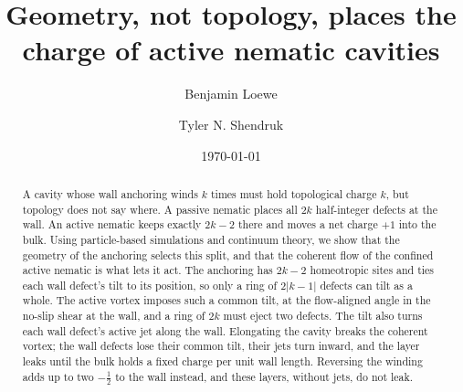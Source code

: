 \documentclass[aps,prl,twocolumn,superscriptaddress,amsmath,amssymb,reprint]{revtex4-2}
\newcommand{\half}{\tfrac12}
\begin{document}
\title{Geometry, not topology, places the charge of active nematic cavities}
\author{Benjamin Loewe}
\author{Tyler N. Shendruk}
\date{\today}

\begin{abstract}
A cavity whose wall anchoring winds $k$ times must hold topological charge $k$, but topology does not say where. A passive nematic places all $2k$ half-integer
defects at the wall. An active nematic keeps exactly $2k-2$ there and moves a net charge $+1$ into the bulk. Using particle-based simulations and continuum theory,
we show that the geometry of the anchoring selects this split, and that the coherent flow of the confined active nematic is what lets it act. The anchoring has
$2k-2$ homeotropic sites and ties each wall defect's tilt to its position, so only a ring of $2|k-1|$ defects can tilt as a whole. The active vortex imposes such
a common tilt, at the flow-aligned angle in the no-slip shear at the wall, and a ring of $2k$ must eject two defects. The tilt also turns each wall defect's active
jet along the wall. Elongating the cavity breaks the coherent vortex; the wall defects lose their common tilt, their jets turn inward, and the layer leaks until the
bulk holds a fixed charge per unit wall length. Reversing the winding adds up to two $-\half$ to the wall instead, and these layers, without jets, do not leak.
\end{abstract}
\maketitle
\end{document}
